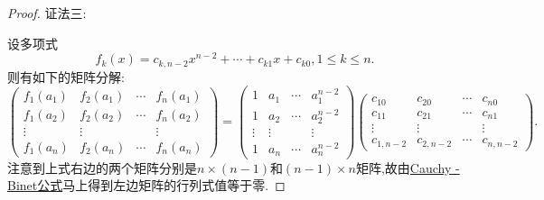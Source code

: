 \documentclass[lang=cn,newtx,10pt,scheme=chinese]{elegantbook}
\begin{document}
\begin{proof}
{\color{blue}证法三:}

设多项式
\[
f_k(x)=c_{k,n - 2}x^{n - 2}+\cdots+c_{k1}x + c_{k0},1\leq k\leq n.
\]
则有如下的矩阵分解:
\[
\begin{pmatrix}
f_1(a_1) & f_2(a_1) & \cdots & f_n(a_1)\\
f_1(a_2) & f_2(a_2) & \cdots & f_n(a_2)\\
\vdots & \vdots & & \vdots\\
f_1(a_n) & f_2(a_n) & \cdots & f_n(a_n)
\end{pmatrix}
=
\begin{pmatrix}
1 & a_1 & \cdots & a_1^{n - 2}\\
1 & a_2 & \cdots & a_2^{n - 2}\\
\vdots & \vdots & & \vdots\\
1 & a_n & \cdots & a_n^{n - 2}
\end{pmatrix}
\begin{pmatrix}
c_{10} & c_{20} & \cdots & c_{n0}\\
c_{11} & c_{21} & \cdots & c_{n1}\\
\vdots & \vdots & & \vdots\\
c_{1,n - 2} & c_{2,n - 2} & \cdots & c_{n,n - 2}
\end{pmatrix}.
\]
注意到上式右边的两个矩阵分别是\(n\times(n - 1)\)和\((n - 1)\times n\)矩阵,故由\hyperref[theorem:Cauchy-Binet公式]{Cauchy - Binet公式}马上得到左边矩阵的行列式值等于零.
\end{proof}
\end{document}

